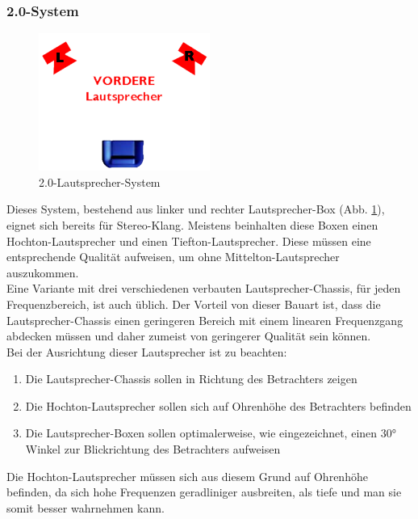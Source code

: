 \subsubsection*{2.0-System}
\begin{figure} [H]
	\centering
	\includegraphics[width=0.5\textwidth]{img/Grundlagen/Mehrweg-Lautsprechersysteme/DOLBYDigital20-cut.jpg}
	\caption{2.0-Lautsprecher-System}
	\label{fig:3.2.3}
\end{figure}

Dieses System, bestehend aus linker und rechter Lautsprecher-Box (Abb. \ref{fig:3.2.3}), eignet sich bereits für Stereo-Klang.
Meistens beinhalten diese Boxen einen Hochton-Lautsprecher und einen Tiefton-Lautsprecher.
Diese müssen eine entsprechende Qualität aufweisen, um ohne Mittelton-Lautsprecher auszukommen.\\
Eine Variante mit drei verschiedenen verbauten Lautsprecher-Chassis, für jeden Frequenzbereich, ist auch üblich.
Der Vorteil von dieser Bauart ist, dass die Lautsprecher-Chassis einen geringeren Bereich mit einem linearen Frequenzgang abdecken müssen und daher zumeist von geringerer Qualität sein können.\\
Bei der Ausrichtung dieser Lautsprecher ist zu beachten:
\begin{enumerate}
	\item Die Lautsprecher-Chassis sollen in Richtung des Betrachters zeigen
	\item Die Hochton-Lautsprecher sollen sich auf Ohrenhöhe des Betrachters befinden
	\item Die Lautsprecher-Boxen sollen optimalerweise, wie eingezeichnet, einen 30° Winkel zur Blickrichtung des Betrachters aufweisen
\end{enumerate}
Die Hochton-Lautsprecher müssen sich aus diesem Grund auf Ohrenhöhe befinden, da sich hohe Frequenzen geradliniger ausbreiten, als tiefe und man sie somit besser wahrnehmen kann.

